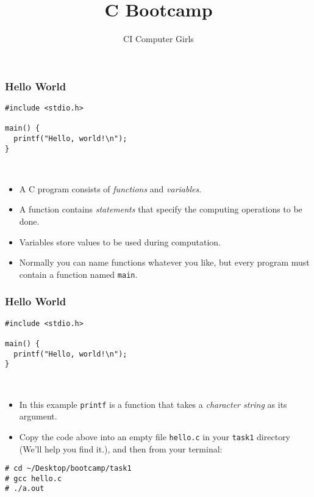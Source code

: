 \documentclass[pdf]{beamer}
\title{C Bootcamp}
\author{CI Computer Girls}
\begin{document}
\begin{frame}
  \titlepage%
\end{frame}

\begin{frame}[fragile]
  \frametitle{Hello World}

\begin{verbatim}
#include <stdio.h>

main() {
  printf("Hello, world!\n");
}
\end{verbatim}
\\
  \begin{itemize}
  \item A C program consists of \textit{functions} and \textit{variables}.
    \pause
  \item A function contains \textit{statements} that specify the
    computing operations to be done.
    \pause
  \item Variables store values to be used during computation.
    \pause
  \item Normally you can name functions whatever you like, but every program
    must contain a function named \texttt{main}.
  \end{itemize}
\end{frame}

\begin{frame}[fragile]
  \frametitle{Hello World}

\begin{verbatim}
#include <stdio.h>

main() {
  printf("Hello, world!\n");
}
\end{verbatim}
\\
  \begin{itemize}
  \item In this example \texttt{printf} is a function that takes a
    \textit{character string} as its argument.
    \pause
  \item Copy the code above into an empty file \texttt{hello.c} in your
    \texttt{task1} directory (We'll help you find it.), and then from your
    terminal:
    \pause
  \end{itemize}
\bigskip
\begin{verbatim}
# cd ~/Desktop/bootcamp/task1
# gcc hello.c
# ./a.out
\end{verbatim}

\end{frame}
\end{document}
